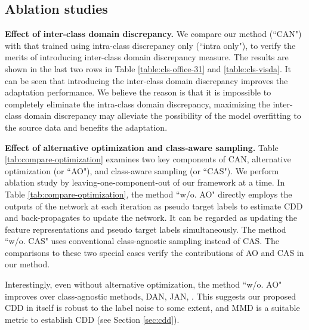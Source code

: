 \documentclass[10pt,twocolumn,letterpaper]{article}
\begin{document}
\subsection{Ablation studies} \label{sec:ablation-study}
\textbf{Effect of inter-class domain discrepancy.}
We compare our method (``CAN") with that trained using intra-class discrepancy only (``intra only"), to verify the merits of introducing inter-class domain discrepancy measure. The results are shown in the last two rows in Table \ref{table:cls-office-31} and \ref{table:cls-visda}. 
It can be seen that introducing the inter-class domain discrepancy 
improves the adaptation performance.
We believe the reason is that 
it is impossible to completely eliminate the intra-class domain discrepancy,
maximizing the inter-class domain discrepancy may alleviate
the possibility of the model overfitting to the source data and
benefits the adaptation.



\textbf{Effect of alternative optimization and class-aware sampling.}
Table \ref{tab:compare-optimization} examines two key components of CAN,
\ie alternative optimization (or ``AO"), and class-aware sampling (or ``CAS").
We perform ablation study by leaving-one-component-out of our framework at a time.
In Table \ref{tab:compare-optimization}, the method ``w/o. AO" 
directly employs the outputs of the network at each iteration as 
pseudo target labels to estimate CDD and back-propagates to update the network.
It can be regarded as updating the feature representations and pseudo target labels
simultaneously.
The method ``w/o. CAS" uses conventional class-agnostic sampling instead of CAS.
The comparisons to these two special cases verify the contributions of AO and CAS in our method.

Interestingly, even without alternative optimization, 
the method ``w/o. AO" improves over 
class-agnostic methods, 
\eg DAN, JAN, \etc.
This suggests our proposed CDD in itself is robust to the label noise to some extent,
and MMD is a suitable metric to establish CDD (see Section \ref{sec:cdd}).

\setlength{\tabcolsep}{6pt}
\begin{table}[ht]
\begin{center}
\end{center}
\caption{\label{tab:compare-optimization}
The effect of alternative optimization (AO) and CAS.
The mean accuracy over six tasks on Office-31 and 
the mean accuracy over 12 classes on VisDA-2017 validation set are reported.
}
\vspace{-2mm}
\end{table}
\end{document}
